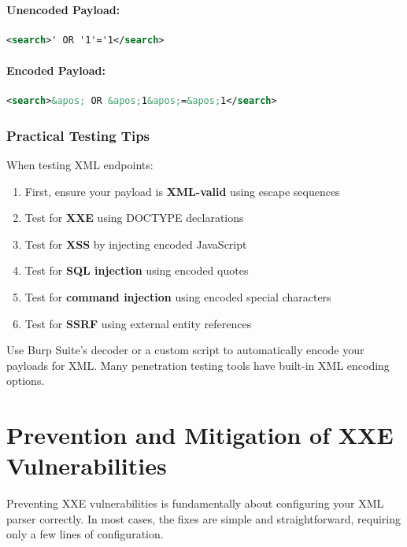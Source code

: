 \documentclass{article}
\begin{document}
\paragraph{Unencoded Payload:}
\begin{lstlisting}[language=XML]
<search>' OR '1'='1</search>
\end{lstlisting}

\paragraph{Encoded Payload:}
\begin{lstlisting}[language=XML]
<search>&apos; OR &apos;1&apos;=&apos;1</search>
\end{lstlisting}

\subsubsection{Practical Testing Tips}

\begin{infobox}
When testing XML endpoints:
\begin{enumerate}
    \item First, ensure your payload is \textbf{XML-valid} using escape sequences
    \item Test for \textbf{XXE} using DOCTYPE declarations
    \item Test for \textbf{XSS} by injecting encoded JavaScript
    \item Test for \textbf{SQL injection} using encoded quotes
    \item Test for \textbf{command injection} using encoded special characters
    \item Test for \textbf{SSRF} using external entity references
\end{enumerate}
\end{infobox}

\begin{codebox}
Use Burp Suite's decoder or a custom script to automatically encode your payloads for XML. Many penetration testing tools have built-in XML encoding options.
\end{codebox}

\section{Prevention and Mitigation of XXE Vulnerabilities}

Preventing XXE vulnerabilities is fundamentally about configuring your XML parser correctly. In most cases, the fixes are simple and straightforward, requiring only a few lines of configuration.
\end{document}
